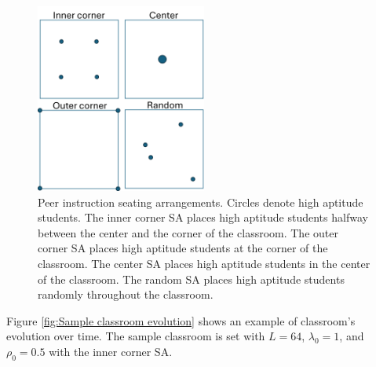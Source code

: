  \begin{figure}[htbp!]
    \centering
    \includegraphics[width=0.5\textwidth]{figures/PI SAs.png}
    \caption[Peer instruction seating arrangements.]{ Peer instruction seating arrangements. 
    Circles denote high aptitude students. 
    The inner corner SA places high aptitude students halfway between the center and the corner of the classroom. 
    The outer corner SA places high aptitude students at the corner of the classroom. 
    The center SA places high aptitude students in the center of the classroom. 
    The random SA places high aptitude students randomly throughout the classroom.}
    \label{fig:PI SAs}
 \end{figure}

 Figure \ref{fig:Sample classroom evolution} shows an example of classroom's evolution over time. The sample classroom is set with $L=64$, $\lambda_0 = 1$, and $\rho_0 = 0.5$ with the inner corner SA.

